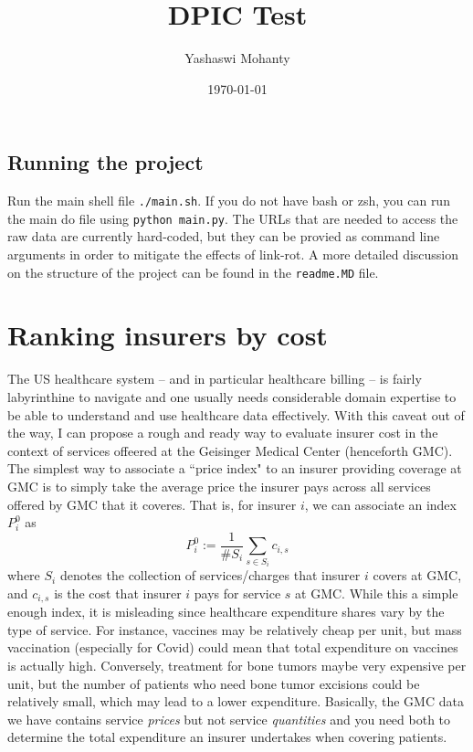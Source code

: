 \documentclass{article}
\title{DPIC Test}
\author{Yashaswi Mohanty}
\date{\today}
\begin{document}
\maketitle

\subsection*{Running the project}
Run the main shell file \verb|./main.sh|. If you do not have bash or zsh, you can run the main do file using \verb|python main.py|. The URLs that are needed to access the raw data are currently hard-coded, but they can be provied as command line arguments in order to mitigate the effects of link-rot. A more detailed discussion on the structure of the project can be found in the \verb|readme.MD| file.  

\section*{Ranking insurers by cost}

The US healthcare system -- and in particular healthcare billing -- is fairly labyrinthine to navigate and one usually needs considerable domain expertise to be able to understand and use healthcare data effectively. With this caveat out of the way, I can propose a rough and ready way to evaluate insurer cost in the context of services offeered at the Geisinger Medical Center (henceforth GMC). The simplest way to associate a ``price index" to an insurer providing coverage at GMC is to simply take the average price the insurer pays across all services offered by GMC that it coveres. That is, for insurer $i$, we can associate an index $P^0_i$ as
\[
	P^0_i := \frac{1}{\#S_i}\sum_{s\in S_i} c_{i,s}
\]
where $S_i$ denotes the collection of services/charges that insurer $i$ covers at GMC, and $c_{i,s}$ is the cost that insurer $i$ pays for service $s$ at GMC. While this a simple enough index, it is misleading since healthcare expenditure shares vary by the type of service. For instance, vaccines may be relatively cheap per unit, but mass vaccination (especially for Covid) could mean that total expenditure on vaccines is actually high. Conversely, treatment for bone tumors maybe very expensive per unit, but the number of patients who need bone tumor excisions could be relatively small, which may lead to a lower expenditure. Basically, the GMC data we have contains service \emph{prices} but not service \emph{quantities} and you need both to determine the total expenditure an insurer undertakes when covering patients.
\end{document}
